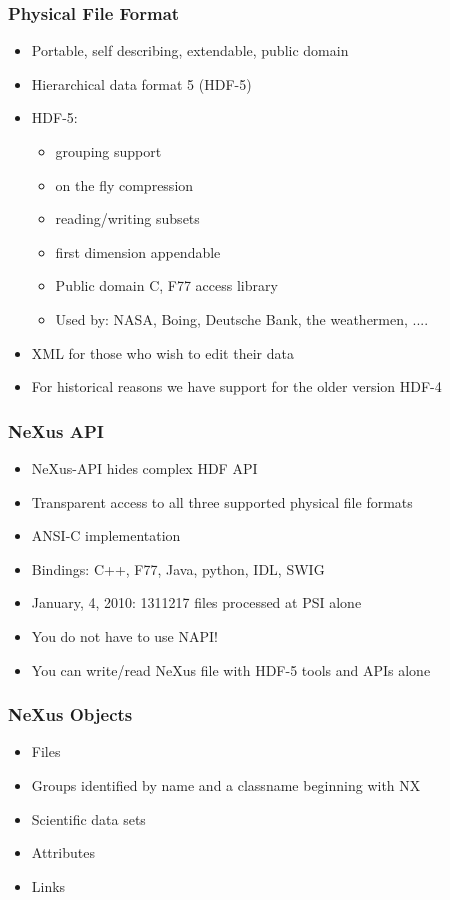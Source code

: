 \documentclass{beamer}
\begin{document}
\begin{frame} \frametitle{Physical File Format }
\begin{itemize}
\item Portable, self describing, extendable, public domain
\item Hierarchical data format 5 (HDF-5)
\item HDF-5:
\begin{itemize}
\item grouping support
\item on the fly compression
\item reading/writing subsets
\item first dimension appendable
\item Public domain C, F77 access library
\item Used by: NASA, Boing, Deutsche Bank, the weathermen, .... 
\end{itemize}
\item XML for those who wish to edit their data
\item For historical reasons we have support for 
   the older version HDF-4
\end{itemize}
\end{frame}


\begin{frame} \frametitle{NeXus API }
\begin{itemize}
\item NeXus-API hides complex HDF API
\item Transparent access to all three supported physical file formats
\item ANSI-C implementation
\item Bindings: C++, F77, Java, python, IDL, SWIG
\item January, 4, 2010: 1311217 files processed at PSI alone
\item {\color{blue}You do not have to use NAPI!}
\item {\color{blue}You can write/read NeXus file with HDF-5 tools and APIs alone}
\end{itemize}
\end{frame}


\begin{frame} \frametitle{NeXus Objects}
\begin{itemize}
\item Files
\item Groups identified by name and a classname beginning with NX
\item Scientific data sets
\item Attributes
\item Links
\end{itemize}
\end{frame}
\end{document}
